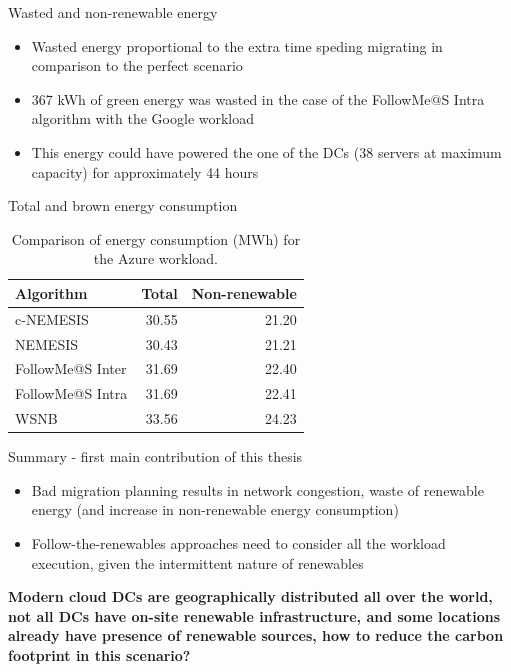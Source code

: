 \documentclass[Ligatures=TeX,table,svgnames,usetotalslideindicator,compress,10pt,aspectratio=169]{beamer}
\begin{document}
\begin{frame}{Wasted and non-renewable energy}  
  \begin{itemize}
  \item Wasted energy proportional to the extra time speding migrating in comparison to the perfect scenario
  \item \alert{367 kWh} of green energy was wasted in the case of the
    FollowMe@S Intra algorithm with the Google workload
  \item This energy could have powered the one of the DCs \alert{(38 servers at maximum capacity)}  for approximately \alert{ 44 hours}
  
  \end{itemize}
  
\end{frame}



\begin{frame}{Total and brown energy consumption}  
  \begin{table}[!h]
    \caption{Comparison of energy consumption (MWh) for the Azure workload.}\label{tab:total_energy_cons} \centering
    \begin{tabular}{|l|r|r|}      
      \hline
      \textbf{Algorithm} & \textbf{Total} &  \textbf{Non-renewable} \\
      \hline
      c-NEMESIS & 30.55 & 21.20 \\
      \hline
      NEMESIS  & 30.43 & 21.21 \\ 
            \hline
      FollowMe@S Inter & 31.69 & 22.40 \\

      \hline
      FollowMe@S Intra & 31.69 & 22.41 \\
      \hline
      WSNB & 33.56 & 24.23 \\
      \hline
    \end{tabular}
  \end{table}  
\end{frame}



\begin{frame}{Summary - first main contribution of this thesis}
    \begin{itemize}
    \item Bad migration planning results in network congestion, waste of renewable energy (and increase in non-renewable energy consumption)
    \item Follow-the-renewables approaches need to consider all the workload execution, given the intermittent nature of renewables
    \end{itemize} \pause

\textbf{Modern cloud DCs are geographically distributed all over the world, not all DCs have on-site renewable infrastructure, and some locations already have presence of renewable sources, how to reduce the carbon footprint in this scenario?}

\end{frame}
\end{document}
